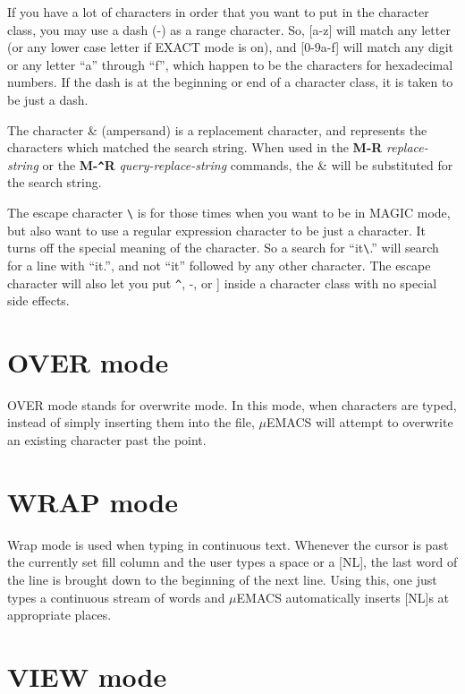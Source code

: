 If you have a lot of characters in order that you want to put in the
character class, you may use a dash (-) as a range character. So, [a-z]
will match any letter (or any lower case letter if EXACT mode is on),
and [0-9a-f] will match any digit or any letter ``a'' through ``f'',
which happen to be the characters for hexadecimal numbers. If the dash
is at the beginning or end of a character class, it is taken to be just
a dash.

The character \& (ampersand) is a replacement character, and represents
the characters which matched the search string. When used in the {\bf
M-R} {\it replace-string} or the {\bf M-\verb+^+R} {\it
query-replace-string} commands, the \& will be substituted for the
search string.

The escape character \verb+\+ is for those times when you want to be in MAGIC
mode, but also want to use a regular expression character to be just a
character. It turns off the special meaning of the character. So a
search for ``it\verb+\+.'' will search for a line with ``it.'', and not
``it'' followed by any other character. The escape character will also
let you put \verb+^+, -, or ] inside a character class with no special
side effects.

\section{OVER mode}

OVER mode stands for overwrite mode. In this mode, when characters are
typed, instead of simply inserting them into the file, $\mu$EMACS will
attempt to overwrite an existing character past the point.

\section{WRAP mode}

Wrap mode is used when typing in continuous text. Whenever the cursor
is past the currently set fill column and the user types a space or a
[NL], the last word of the line is brought down to the beginning of the
next line. Using this, one just types a continuous stream of words and
$\mu$EMACS automatically inserts [NL]s at appropriate places.

\section{VIEW mode}


